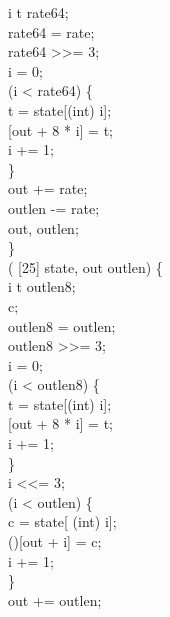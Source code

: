   i t rate64;\\
rate64 = rate;\\
rate64 >{}>= 3;\\
i = 0;\\
  (i < rate64) \{\\
t = state[(int) i];\\
[out + 8 * i] = t;\\
i += 1;\\
\}\\
out += rate;\\
outlen -= rate;\\
 out, outlen;\\
\}\\
  ( [25] state,   out outlen) \jasminarrow{}   \{\\
  i t outlen8;\\
  c;\\
outlen8 = outlen;\\
outlen8 >{}>= 3;\\
i = 0;\\
  (i < outlen8) \{\\
t = state[(int) i];\\
[out + 8 * i] = t;\\
i += 1;\\
\}\\
i <{}<= 3;\\
  (i < outlen) \{\\
c = state[ (int) i];\\
()[out + i] = c;\\
i += 1;\\
\}\\
out += outlen;\\
